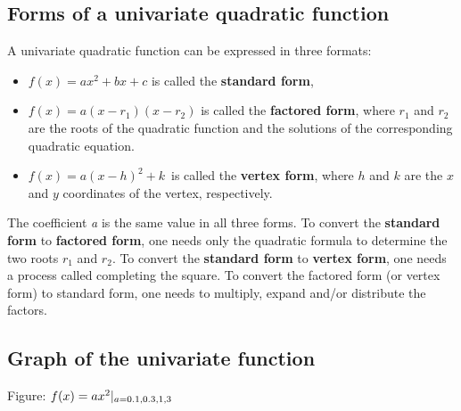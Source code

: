 \subsection{Forms of a univariate quadratic function}
\label{sss:form-3213}




A univariate quadratic function can be expressed in three formats:



\begin{itemize}
    \item $f(x) = a x^2 + b x + c $ is called the \textbf{standard form},
    \item $f(x) = a(x - r _1)(x - r _2)$ is called the \textbf{factored form}, where $r _1$ and $r _2$ are the roots of the quadratic function and the solutions of the corresponding quadratic equation.
    \item $f(x) = a(x - h)^2 + k \,$ is called the \textbf{vertex form}, where $h$ and $k$ are the $x$ and $y$ coordinates of the vertex, respectively.
\end{itemize}

The coefficient \textit{a} is the same value in all three forms. To convert the
\textbf{standard form} to \textbf{factored form}, one needs only the quadratic formula to
determine the two roots $r _1$ and $r _2$. To convert the \textbf{standard form} to
\textbf{vertex form}, one needs a process called completing the square. To convert the
factored form (or vertex form) to standard form, one needs to multiply, expand and/or
distribute the factors.




\subsection{Graph of the univariate function}
\label{sss:grap-3928}







Figure: $f(x) = ax^2 | _ {a=\\{0.1,0.3,1,3\\}} $






